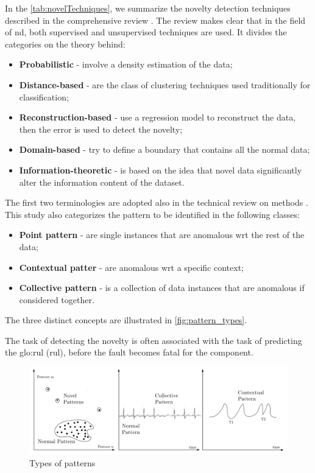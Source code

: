 In the \autoref{tab:novelTechniques}, we summarize the novelty detection techniques described in the comprehensive review \cite{NoveltyReview}. The review makes clear that in the field of \gls{nd}, both supervised and unsupervised techniques are used. It divides  the categories on the theory behind:
\begin{itemize}
    \item \textbf{Probabilistic} - involve a density estimation of the data;
    \item \textbf{Distance-based} - are the class of clustering techniques used traditionally for classification;
    \item \textbf{Reconstruction-based} - use a regression model to reconstruct the data, then the error is used to detect the novelty;
    \item \textbf{Domain-based} - try to define a boundary that contains all the normal data;
    \item \textbf{Information-theoretic} - is based on the idea that novel data significantly alter the information content of the dataset.
\end{itemize}

{}

The first two terminologies are adopted also in the technical review on methods \cite{NoveltyTech}. This study also categorizes the pattern to be identified in the following classes:
\begin{itemize}
    \item \textbf{Point pattern} - are single instances that are anomalous \gls{wrt} the rest of the data;
    \item \textbf{Contextual patter} - are anomalous \gls{wrt} a specific context;
    \item \textbf{Collective pattern} - is a collection of data instances that are anomalous if considered together.
\end{itemize}

The three distinct concepts are illustrated in \autoref{fig:pattern_types}.

The task of detecting the novelty is often associated with the task of predicting the \gls{glo:rul} (\gls{rul}), before the fault becomes fatal for the component.

\begin{figure}
    \centering
    \includegraphics[width=\textwidth]{images/StateArt/patterns.png}
    \caption{Types of patterns \cite{NoveltyTech}}
    \label{fig:pattern_types}
\end{figure}

